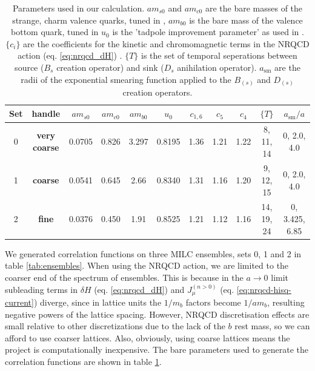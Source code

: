 \begin{table}[t!]
\hspace{-40pt}
 \begin{tabular}{c c c c c c c c c c c}
 \hline
 Set & handle & $am_{s0}$ & $am_{c0}$ & $am_{b0}$ & $u_0$ & $c_{1,6}$ & $c_5$ & $c_4$ & $\{T\}$ & $a_{\text{sm}}/a$ \\ [0.5ex] 
 \hline
 0 & {\textbf{very coarse}} & 0.0705 & 0.826 & 3.297 & 0.8195 & 1.36 & 1.21 & 1.22 & 8, 11, 14 & 0, 2.0, 4.0 \\ [1ex]
 1 & {\textbf{coarse}} & 0.0541 & 0.645 & 2.66 & 0.8340 & 1.31 & 1.16 & 1.20 & 9, 12, 15 & 0, 2.0, 4.0 \\ [1ex]
 2 & {\textbf{fine}} & 0.0376 & 0.450 & 1.91 & 0.8525 &  1.21 & 1.12 & 1.16 & 14, 19, 24 & 0, 3.425, 6.85 \\ [1ex]
 \hline
\end{tabular}
 \caption{Parameters used in our calculation. $am_{s0}$ and $am_{c0}$ are the bare masses of the strange, charm valence quarks, tuned in \cite{PhysRevD.91.054508}, $am_{b0}$ is the bare mass of the valence bottom quark, tuned in \cite{Dowdall:2011wh} $u_0$ is the 'tadpole improvement parameter' as used in \cite{Dowdall:2011wh}. $\{c_i\}$ are the coefficients for the kinetic and chromomagnetic terms in the NRQCD action (eq. \eqref{eq:nrqcd_dH}) \cite{Hammant:2013sca}. $\{T\}$ is the set of temporal seperations between source ($B_s$ creation operator) and sink ($D_s$ anihilation operator). $a_{\text{sm}}$ are the radii of the exponential smearing function applied to the $B_{(s)}$ and $D_{(s)}$ creation operators.
   \label{tab:quarkmasses}}
\end{table}

We generated correlation functions on three MILC ensembles, sets 0, 1 and 2 in table \ref{tab:ensembles}. When using the NRQCD action, we are limited to the coarser end of the spectrum of ensembles. This is because in the $a\to 0$ limit subleading terms in $\delta H$ (eq. \eqref{eq:nrqcd_dH}) and $J^{(n>0)}_{\mu}$ (eq. \eqref{eq:nrqcd-hisq-current}) diverge, since in lattice units the $1/m_b$ factors become $1/am_b$, resulting negative powers of the lattice spacing. However, NRQCD discretisation effects are small relative to other discretizations due to the lack of the $b$ rest mass, so we can afford to use coarser lattices. Also, obviously, using coarse lattices means the project is computationally inexpensive. The bare parameters used to generate the correlation functions are shown in table \ref{tab:quarkmasses}.

